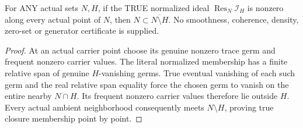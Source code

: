 \begin{lemma}
\label{hir:sharp-actual-normalized-member-nonzero-implies-true-density}
\leanok
For ANY actual sets $N,H$, if the TRUE normalized ideal
$\operatorname{Res}_N\mathcal I_H$ is nonzero along every actual point
of $N$, then $N\subset\overline{N\setminus H}$. No smoothness,
coherence, density, zero-set or generator certificate is supplied.
\end{lemma}
\begin{proof}
At an actual carrier point choose its genuine nonzero trace germ and
frequent nonzero carrier values. The literal normalized membership has
a finite relative span of genuine $H$-vanishing germs. True eventual
vanishing of each such germ and the real relative span equality force
the chosen germ to vanish on the entire nearby $N\cap H$. Its frequent
nonzero carrier values therefore lie outside $H$. Every actual ambient
neighborhood consequently meets $N\setminus H$, proving true closure
membership point by point.
\end{proof}

